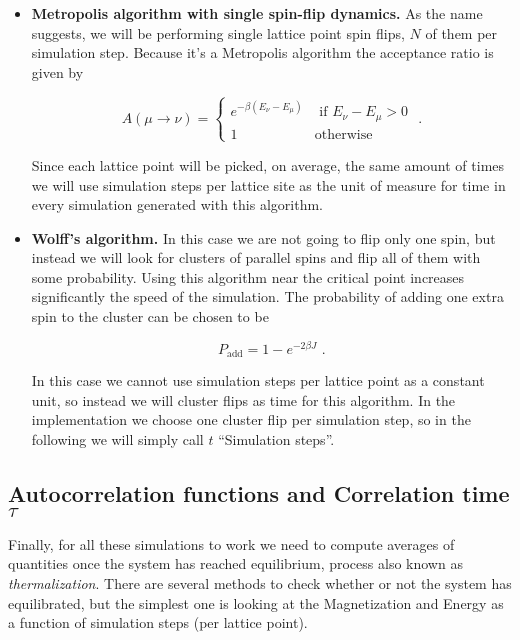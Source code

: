 \documentclass[8 pt, twocolumn]{article}
\begin{document}
\begin{itemize}
  \item \textbf{Metropolis algorithm with single spin-flip dynamics.} As the name suggests, we will be performing single lattice point spin flips, $N$ of them per simulation step. Because it's a Metropolis algorithm the acceptance ratio is given by

  \begin{equation} A(\mu \rightarrow \nu) = \left\{ \begin{matrix} e^{-\beta(E_\nu-E_\mu)} & \text{ if } E_\nu - E_\mu > 0 \\
  1 & \text{otherwise} \end{matrix} \right. \text{ .} \end{equation}

  Since each lattice point will be picked, on average, the same amount of times we will use simulation steps per lattice site as the unit of measure for time in every simulation generated with this algorithm.

  \item \textbf{Wolff's algorithm.} In this case we are not going to flip only one spin, but instead we will look for clusters of parallel spins and flip all of them with some probability. Using this algorithm near the critical point increases significantly the speed of the simulation. The probability of adding one extra spin to the cluster can be chosen to be

  \begin{equation} P_{\text{add}} = 1 - e^{-2\beta J} \text{ .} \end{equation}

  In this case we cannot use simulation steps per lattice point as a constant unit, so instead we will  cluster flips as time for this algorithm. In the implementation we choose one cluster flip per simulation step, so in the following we will simply call $t$ ``Simulation steps''.
\end{itemize}

\subsection{Autocorrelation functions and Correlation time $\tau$}

Finally, for all these simulations to work we need to compute averages of quantities once the system has reached equilibrium, process also known as \emph{thermalization}. There are several methods to check whether or not the system has equilibrated, but the simplest one is looking at the Magnetization and Energy as a function of simulation steps (per lattice point).
\end{document}
